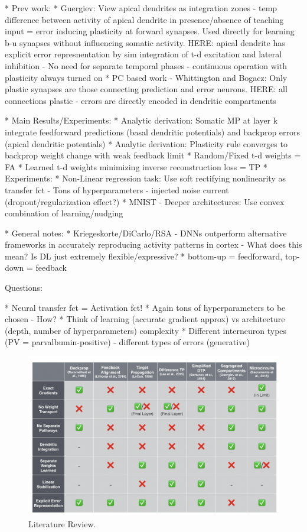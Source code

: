 \documentclass[colorinlistoftodos]{article}
\theoremstyle{definition}
\begin{document}
* Prev work:
    * Guergiev: View apical dendrites as integration zones - temp difference between activity of apical dendrite in presence/absence of teaching input = error inducing plasticity at forward synapses. Used directly for learning b-u synapses without influencing somatic activity. HERE: apical dendrite has explicit error represnentation by sim integration of t-d excitation and lateral inhibition - No need for separate temporal phases - continuous operation with plasticity always turned on
    * PC based work - Whittington and Bogacz: Only plastic synapses are those connecting prediction and error neurons. HERE: all connections plastic - errors are directly encoded in dendritic compartments

* Main Results/Experiments:
    * Analytic derivation: Somatic MP at layer k integrate feedforward predictions (basal dendritic potentials) and backprop errors (apical dendritic potentials)
    * Analytic derivation: Plasticity rule converges to backprop weight change with weak feedback limit
    * Random/Fixed t-d weights = FA
    * Learned t-d weights minimizing inverse reconstruction loss = TP
    * Experiments:
        * Non-Linear regression task: Use soft rectifying nonlinearity as transfer fct - Tons of hyperparameters - injected noise current (dropout/regularization effect?)
        * MNIST - Deeper architectures: Use convex combination of learning/nudging

* General notes:
    * Kriegeskorte/DiCarlo/RSA - DNNs outperform alternative frameworks in accurately reproducing activity patterns in cortex - What does this mean? Is DL just extremely flexible/expressive?
    * bottom-up = feedforward, top-down = feedback


Questions:

* Neural transfer fct = Activation fct!
* Again tons of hyperparameters to be chosen - How?
* Think of learning (accurate gradient approx) vs architecture (depth, number of hyperparameters) complexity
* Different interneuron types (PV = parvalbumin-positive) - different types of errors (generative)

\begin{figure}[H]
	\centering
	\includegraphics[width=\textwidth]{../figures/report/lit_rev}
	\caption{Literature Review.}	
\end{figure}
\end{document}
